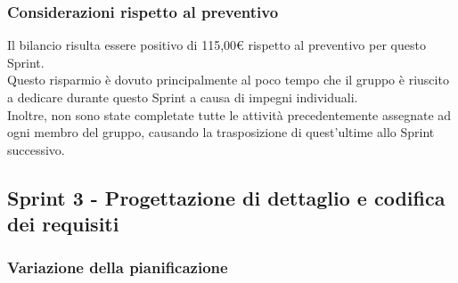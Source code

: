 \subsubsection{Considerazioni rispetto al preventivo} \label{subsubsection:considerazioni_finali_sprint2}
Il bilancio risulta essere positivo di 115,00€ rispetto al preventivo per questo Sprint\glo{}.
\\Questo risparmio è dovuto principalmente al poco tempo che il gruppo è riuscito a dedicare durante questo Sprint\glo{} a causa di impegni individuali.
\\Inoltre, non sono state completate tutte le attività precedentemente assegnate ad ogni membro del gruppo, causando la trasposizione di quest'ultime allo Sprint\glo{} successivo.


\subsection{Sprint 3 - Progettazione di dettaglio e codifica dei requisiti} \label{subsection:consuntivo_sprint3}
\subsubsection{Variazione della pianificazione} \label{subsubsection:variazione_pianificazione_sprint3}

